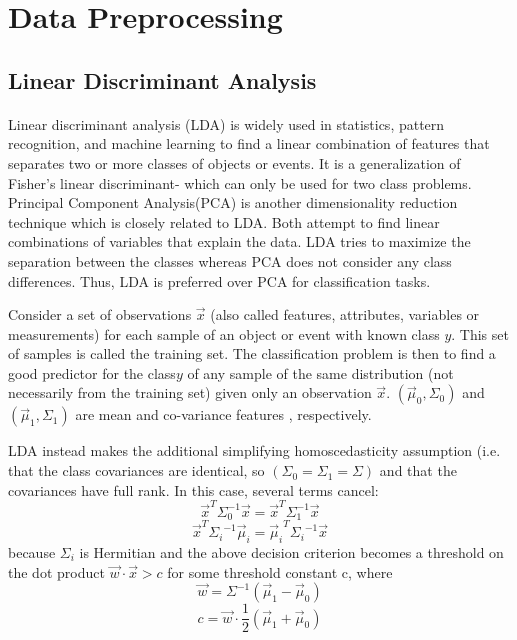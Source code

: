 \documentclass[12pt, a4paper]{report}
\begin{document}
\section{Data Preprocessing}

\subsection{Linear Discriminant Analysis}

\paragraph{} Linear discriminant analysis (LDA)  is widely used in statistics, pattern recognition, and machine learning to find a linear combination of features that  separates two or more classes of objects or events. It is a generalization of Fisher's linear discriminant- which can only be used for two class problems.
Principal Component Analysis(PCA) is another dimensionality reduction technique which is closely related to LDA. Both attempt to find linear combinations of variables that explain the data. LDA tries to maximize the separation between the classes whereas PCA does not consider any class differences. Thus, LDA is preferred over PCA for classification tasks.

Consider a set of observations ${\vec {x}}$ (also called features, attributes, variables or measurements) for each sample of an object or event with known class $y$. This set of samples is called the training set. The classification problem is then to find a good predictor for the class$y$ of any sample of the same distribution (not necessarily from the training set) given only an observation ${\vec {x}}$.\cite{ldaonetwo}
$\left({\vec {\mu }}_{0},\Sigma _{0}\right)$ and$\left({\vec {\mu }}_{1},\Sigma _{1}\right)$ are mean and co-variance features , respectively. 

LDA instead makes the additional simplifying homoscedasticity assumption (i.e. that the class covariances are identical, so  $(\Sigma _{0}=\Sigma _{1}=\Sigma )$ and that the covariances have full rank. In this case, several terms cancel:
$${\vec {x}}^{T}\Sigma _{0}^{-1}{\vec {x}}={\vec {x}}^{T}\Sigma _{1}^{-1}{\vec {x}}$$
$${\displaystyle {\vec {x}}^{T}{\Sigma _{i}}^{-1}{\vec {\mu }}_{i}={{\vec {\mu }}_{i}}^{T}{\Sigma _{i}}^{-1}{\vec {x}}}$$ because $\Sigma _{i}$ is Hermitian
and the above decision criterion becomes a threshold on the dot product ${\vec {w}}\cdot {\vec {x}}>c$ for some threshold constant c, where
$${\vec {w}}=\Sigma ^{-1}({\vec {\mu }}_{1}-{\vec {\mu }}_{0})$$
$${\displaystyle c={\vec {w}}\cdot {\frac {1}{2}}({\vec {\mu }}_{1}+{\vec {\mu }}_{0})}$$
\end{document}
